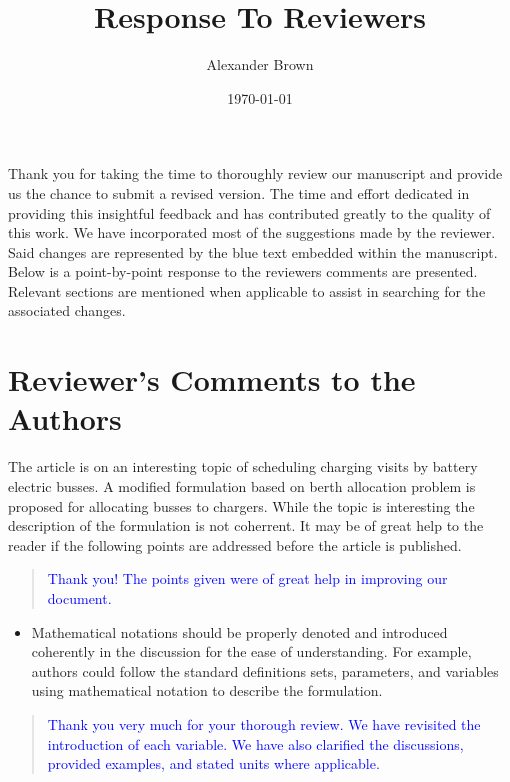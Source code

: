 \documentclass[11pt,a4paper,final]{article}
\author{Alexander Brown}
\date{\today}
\title{Response To Reviewers}
\begin{document}
\maketitle
\tableofcontents

Thank you for taking the time to thoroughly review our manuscript and provide us the chance to submit a revised version. The time and effort dedicated in providing this insightful feedback and has contributed greatly to the quality of this work. We have incorporated most of the suggestions made by the reviewer. Said changes are represented by the blue text embedded within the manuscript. Below is a point-by-point response to the reviewers comments are presented. Relevant sections are mentioned when applicable to assist in searching for the associated changes.

\section{Reviewer's Comments to the Authors}
\label{sec:orge536ebc}

The article is on an interesting topic of scheduling charging visits by battery electric busses. A modified formulation
based on berth allocation problem is proposed for allocating busses to chargers. While the topic is interesting the
description of the formulation is not coherrent. It may be of great help to the reader if the following points are
addressed before the article is published.

\begin{quote}
  \textcolor{blue}{Thank you! The points given were of great help in improving our document.}
\end{quote}

\begin{itemize}
\item Mathematical notations should be properly denoted and introduced coherently in the discussion for the ease of understanding. For example, authors could follow the standard definitions sets, parameters, and variables using mathematical notation to describe the formulation.
\end{itemize}

\begin{quote}
  \textcolor{blue}{Thank you very much for your thorough review. We have revisited the introduction of each variable. We have also clarified the discussions, provided examples, and stated units where applicable.}
\end{quote}
\end{document}

